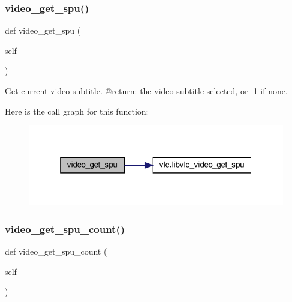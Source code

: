 \subsubsection{\texorpdfstring{video\+\_\+get\+\_\+spu()}{video\_get\_spu()}}
{\footnotesize\ttfamily def video\+\_\+get\+\_\+spu (\begin{DoxyParamCaption}\item[{}]{self }\end{DoxyParamCaption})}

\begin{DoxyVerb}Get current video subtitle.
@return: the video subtitle selected, or -1 if none.
\end{DoxyVerb}
 Here is the call graph for this function\+:
\nopagebreak
\begin{figure}[H]
\begin{center}
\leavevmode
\includegraphics[width=319pt]{classvlc_1_1_media_player_ae9a4f3a68dcd0bbb7d630ba3109fd378_cgraph}
\end{center}
\end{figure}
\mbox{\label{classvlc_1_1_media_player_a57b4b64ec9386749a6b4b16e2578423c}} 
\subsubsection{\texorpdfstring{video\+\_\+get\+\_\+spu\+\_\+count()}{video\_get\_spu\_count()}}
{\footnotesize\ttfamily def video\+\_\+get\+\_\+spu\+\_\+count (\begin{DoxyParamCaption}\item[{}]{self }\end{DoxyParamCaption})}

